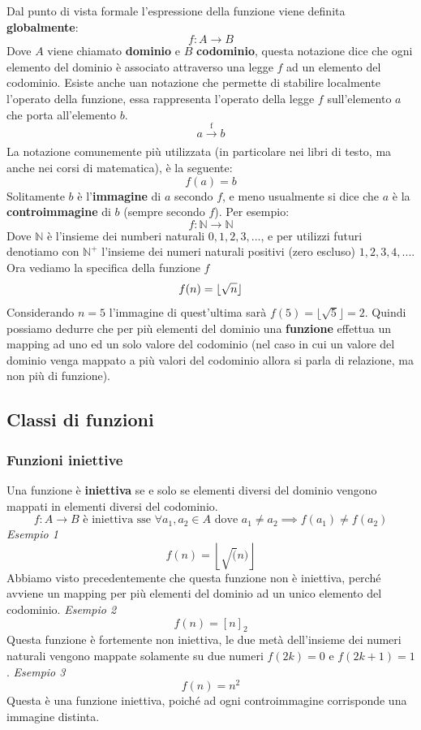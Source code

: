 \documentclass{article}
\begin{document}
Dal punto di vista formale l'espressione della funzione viene definita \textbf{globalmente}:
$$f:A\rightarrow B$$
Dove $A$ viene chiamato \textbf{dominio} e $B$ \textbf{codominio}, questa notazione dice che ogni elemento del dominio è associato attraverso una legge $f$ ad un elemento del codominio. Esiste anche uan notazione che permette di stabilire localmente l'operato della funzione, essa rappresenta l'operato della legge $f$ sull'elemento $a$ che porta all'elemento $b$.
$$a \xrightarrow[\text{}]{\text{f}} b$$
\newline
La notazione comunemente più utilizzata (in particolare nei libri di testo, ma anche nei corsi di matematica), è la seguente:
$$f(a)=b$$
Solitamente $b$ è l'\textbf{immagine} di $a$ secondo $f$, e meno usualmente si dice che $a$ è la \textbf{controimmagine} di $b$ (sempre secondo $f$).
\newline
\newline
Per esempio:
$$f:\mathbb{N} \rightarrow \mathbb{N}$$
Dove $\mathbb{N}$ è l'insieme dei numberi naturali ${0,1,2,3,...}$, e per utilizzi futuri denotiamo con $\mathbb{N}^+$ l'insieme dei numeri naturali positivi (zero escluso) ${1,2,3,4,...}$.
\newline
Ora vediamo la specifica della funzione $f$
$$f(n)=\lfloor \sqrtsign{n}\rfloor$$
Considerando $n=5$ l'immagine di quest'ultima sarà $f(5)=\lfloor\sqrt{5}\rfloor=2$.
\newline
Quindi possiamo dedurre che per più elementi del dominio una \textbf{funzione} effettua un mapping ad uno ed un solo valore del codominio (nel caso in cui un valore del dominio venga mappato a più valori del codominio allora si parla di relazione, ma non più di funzione).
\subsection{Classi di funzioni}
\subsubsection{Funzioni iniettive}

Una funzione è \textbf{iniettiva} se e solo se elementi diversi del dominio vengono mappati in elementi diversi del codominio.
$$f:A\rightarrow B\text{ è iniettiva sse } \forall a_1,a_2\in A \text{ dove } a_1\neq a_2 \implies f(a_1)\neq f(a_2)$$
\newline
\textit{Esempio 1}
$$f(n)=\left\lfloor\sqrt(n)\right\rfloor$$
Abbiamo visto precedentemente che questa funzione non è iniettiva, perché avviene un mapping per più elementi del dominio ad un unico elemento del codominio.
\newline
\newline
\textit{Esempio 2}
$$f(n)=[n]_2$$
Questa funzione è fortemente non iniettiva, le due metà dell'insieme dei numeri naturali vengono mappate solamente su due numeri $f(2k)=0$ e $f(2k+1)=1$.
\newline
\newline
\textit{Esempio 3}
$$f(n)=n^2$$
Questa è una funzione iniettiva, poiché ad ogni controimmagine corrisponde una immagine distinta.
\end{document}

